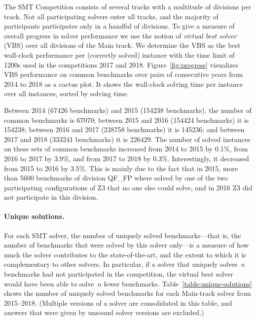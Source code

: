 \documentclass[dvipsnames,table,twoside,11pt]{article}
\begin{document}
The SMT Competition consists of several tracks with a multitude of divisions
per track.
Not all participating solvers enter all tracks, and the majority of
participants participates only in a handful of divisions.
To give a measure of overall progress in solver performance we
use the notion of \emph{virtual best solver} (VBS) over all divisions of the
Main track.
We determine the VBS as the best wall-clock performance per (correctly solved)
instance with the time limit of 1200s used in the competitions 2017 and 2018.
Figure~\ref{fig:progress} visualizes VBS performance on common benchmarks over
pairs of consecutive years from 2014 to 2018 as a cactus plot.
It shows the wall-clock solving time per instance over all instances, sorted by
solving time.


Between 2014 (67426 benchmarks) and 2015 (154238 benchmarks),
the number of common benchmarks is 67070;
between 2015 and 2016 (154424 benchmarks) it is 154238;
between 2016 and 2017 (238758 benchmarks) it is 145236;
and between 2017 and 2018 (333241 benchmarks) it is 226429.
The number of solved instances on these sets of common benchmarks
increased from 2014 to 2015 by 0.1\%, from 2016 to 2017 by 3.9\%,
and from 2017 to 2018 by 0.3\%.
Interestingly, it decreased from 2015 to 2016 by 3.5\%.
This is mainly due to the fact that in 2015, more than 5600 benchmarks of
division QF\_FP where solved by one of the two participating configurations of
Z3 that no one else could solve, and in 2016 Z3 did not participate in this
division.





\paragraph{Unique solutions.}

For each SMT solver, the number of uniquely solved benchmarks---that
is, the number of benchmarks that were solved by this solver only---is
a measure of how much the solver contributes to the state-of-the-art,
and the extent to which it is complementary to other solvers.  In
particular, if a solver that uniquely solves~$n$ benchmarks had not
participated in the competition, the virtual best solver would have
been able to solve~$n$ fewer benchmarks.
Table~\ref{table:unique-solutions} shows the number of uniquely solved
benchmarks for each Main-track solver from 2015--2018.  (Multiple
versions of a solver are consolidated in this table, and answers that
were given by unsound solver versions are excluded.)
\end{document}
